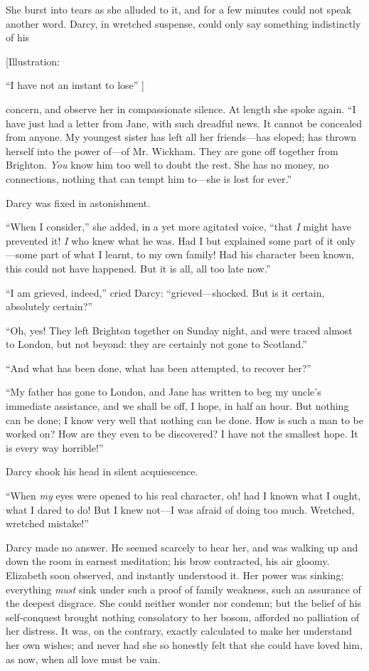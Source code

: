 \documentclass[12pt]{book}
\begin{document}
She burst into tears as she alluded to it, and for a few minutes could not speak another word. Darcy, in wretched suspense, could only say something indistinctly of his

[Illustration:

``I have not an instant to lose'' ]

concern, and observe her in compassionate silence. At length she spoke again. ``I have just had a letter from Jane, with such dreadful news. It cannot be concealed from anyone. My youngest sister has left all her friends---has eloped; has thrown herself into the power of---of Mr. Wickham. They are gone off together from Brighton. \textit{You} know him too well to doubt the rest. She has no money, no connections, nothing that can tempt him to---she is lost for ever.''

Darcy was fixed in astonishment.

``When I consider,'' she added, in a yet more agitated voice, ``that \textit{I} might have prevented it! \textit{I} who knew what he was. Had I but explained some part of it only---some part of what I learnt, to my own family! Had his character been known, this could not have happened. But it is all, all too late now.''

``I am grieved, indeed,'' cried Darcy: ``grieved---shocked. But is it certain, absolutely certain?''

``Oh, yes! They left Brighton together on Sunday night, and were traced almost to London, but not beyond: they are certainly not gone to Scotland.''

``And what has been done, what has been attempted, to recover her?''

``My father has gone to London, and Jane has written to beg my uncle's immediate assistance, and we shall be off, I hope, in half an hour. But nothing can be done; I know very well that nothing can be done. How is such a man to be worked on? How are they even to be discovered? I have not the smallest hope. It is every way horrible!''

Darcy shook his head in silent acquiescence.

``When \textit{my} eyes were opened to his real character, oh! had I known what I ought, what I dared to do! But I knew not---I was afraid of doing too much. Wretched, wretched mistake!''

Darcy made no answer. He seemed scarcely to hear her, and was walking up and down the room in earnest meditation; his brow contracted, his air gloomy. Elizabeth soon observed, and instantly understood it. Her power was sinking; everything \textit{must} sink under such a proof of family weakness, such an assurance of the deepest disgrace. She could neither wonder nor condemn; but the belief of his self-conquest brought nothing consolatory to her bosom, afforded no palliation of her distress. It was, on the contrary, exactly calculated to make her understand her own wishes; and never had she so honestly felt that she could have loved him, as now, when all love must be vain.
\end{document}

